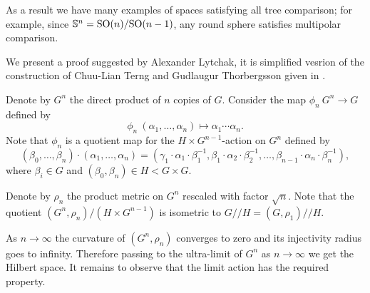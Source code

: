 As a result we have many examples of spaces satisfying all tree comparison;
for example, since $\mathbb{S}^n=\mathrm{SO}(n)/\mathrm{SO}(n-1)$, any round sphere satisfies multipolar comparison.

We present a proof suggested by Alexander Lytchak, it is simplified vesrion of the construction of Chuu-Lian Terng and Gudlaugur Thorbergsson given in \cite[Section 4]{terng-thorbergsson}.


Denote by $G^n$ the direct product of $n$ copies of $G$.
Consider the map $\phi_n\:G^n\to G$ defined by
\[\phi_n\:(\alpha_1,\dots,\alpha_n)\mapsto \alpha_1\cdots\alpha_n.\]
Note that $\phi_n$ is a quotient map for the $H\times G^{n-1}$-action on $G^n$ defined by
\[(\beta_0,\dots,\beta_n)\cdot(\alpha_1,\dots,\alpha_n)=(\gamma_1\cdot \alpha_1\cdot\beta_1^{-1},\beta_1\cdot\alpha_2\cdot\beta_2^{-1},\dots,\beta_{n-1}\cdot\alpha_n\cdot\beta_n^{-1}),\]
where $\beta_i\in G$ and $(\beta_0,\beta_n)\in H<G\times G$. 

Denote by $\rho_n$ the product metric on $G^n$ rescaled with factor $\sqrt{n}$.
Note that the quotient $(G^n,\rho_n)/(H\times G^{n-1})$ is isometric to $G/\!\!/H=(G,\rho_1)/\!\!/H$.

As $n\to\infty$ the curvature of $(G^n,\rho_n)$ converges to zero and its injectivity radius goes to infinity.
Therefore passing to the ultra-limit of $G^n$ as $n\to\infty$ we get the Hilbert space.
It remains to observe that the limit action has the required property.
\qeds